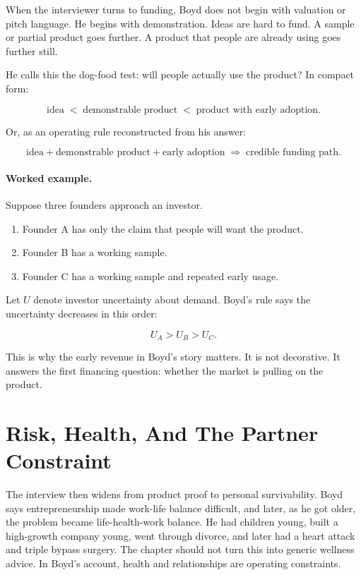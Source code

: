 When the interviewer turns to funding, Boyd does not begin with valuation or pitch language. He begins with demonstration. Ideas are hard to fund. A sample or partial product goes further. A product that people are already using goes further still.

He calls this the dog-food test: will people actually use the product? In compact form:

\begin{equation}
\text{idea}
\;<\;
\text{demonstrable product}
\;<\;
\text{product with early adoption}.
\end{equation}

Or, as an operating rule reconstructed from his answer:

\begin{equation}
\text{idea}
+
\text{demonstrable product}
+
\text{early adoption}
\;\Longrightarrow\;
\text{credible funding path}.
\end{equation}

\paragraph{Worked example.}
Suppose three founders approach an investor.

\begin{enumerate}
\item Founder A has only the claim that people will want the product.
\item Founder B has a working sample.
\item Founder C has a working sample and repeated early usage.
\end{enumerate}

Let \(U\) denote investor uncertainty about demand. Boyd's rule says the uncertainty decreases in this order:

\begin{equation}
U_A > U_B > U_C.
\end{equation}

This is why the early revenue in Boyd's story matters. It is not decorative. It answers the first financing question: whether the market is pulling on the product.

\section{Risk, Health, And The Partner Constraint}

The interview then widens from product proof to personal survivability. Boyd says entrepreneurship made work-life balance difficult, and later, as he got older, the problem became life-health-work balance. He had children young, built a high-growth company young, went through divorce, and later had a heart attack and triple bypass surgery. The chapter should not turn this into generic wellness advice. In Boyd's account, health and relationships are operating constraints.

